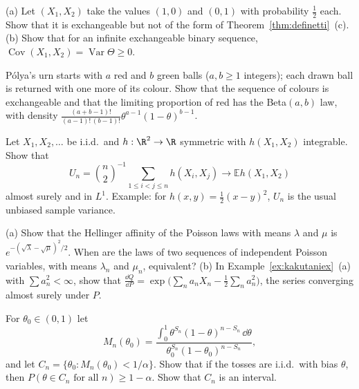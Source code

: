 \begin{exercise}[$\star$]\label{ex:finiteexch}
(a) Let $(X_1,X_2)$ take the values $(1,0)$ and $(0,1)$ with probability $\frac12$ each. Show that it is exchangeable but not of the form of Theorem~\ref{thm:definetti}~(c).
(b) Show that for an infinite exchangeable binary sequence, $\operatorname{Cov}(X_1,X_2)=\operatorname{Var}\Theta\ge0$.
\end{exercise}

\begin{exercise}[$\star\star$]\label{ex:polyabeta}
P\'olya's urn starts with $a$ red and $b$ green balls ($a,b\ge1$ integers); each drawn ball is returned with one more of its colour. Show that the sequence of colours is exchangeable and that the limiting proportion of
red has the Beta$(a,b)$ law, with density $\frac{(a+b-1)!}{(a-1)!\,(b-1)!}\theta^{a-1}(1-\theta)^{b-1}$.
\end{exercise}

\begin{exercise}[$\star\star$]\label{ex:ustat}
Let $X_1,X_2,\dots$ be i.i.d.\ and $h:\R^2\to\R$ symmetric with $h(X_1,X_2)$ integrable. Show that
\[
U_n=\binom n2^{-1}\sum_{1\le i<j\le n}h(X_i,X_j)\longrightarrow\mathbb Eh(X_1,X_2)
\]
almost surely and in $L^1$. Example: for $h(x,y)=\frac12(x-y)^2$, $U_n$ is the usual unbiased sample variance.
\end{exercise}

\begin{exercise}[$\star\star$]\label{ex:kakutanipoisson}
(a) Show that the Hellinger affinity of the Poisson laws with means $\lambda$ and $\mu$ is $e^{-(\sqrt\lambda-\sqrt\mu)^2/2}$. When are the laws of two sequences of independent Poisson variables, with means
$\lambda_n$ and $\mu_n$, equivalent?
(b) In Example~\ref{ex:kakutaniex}~(a) with $\sum a_n^2<\infty$, show that $\frac{\dd Q}{\dd P}=\exp\bigl(\sum_na_nX_n-\frac12\sum_na_n^2\bigr)$, the series converging almost surely under $P$.
\end{exercise}

\begin{exercise}[$\star\star$]\label{ex:confseq}
For $\theta_0\in(0,1)$ let
\[
M_n(\theta_0)=\frac{\int_0^1\theta^{S_n}(1-\theta)^{n-S_n}\,\dd\theta}{\theta_0^{S_n}(1-\theta_0)^{n-S_n}},
\]
and let $C_n=\{\theta_0:M_n(\theta_0)<1/\alpha\}$. Show that if the tosses are i.i.d.\ with bias $\theta$, then $P(\theta\in C_n\text{ for all }n)\ge1-\alpha$. Show that $C_n$ is an interval.
\end{exercise}

